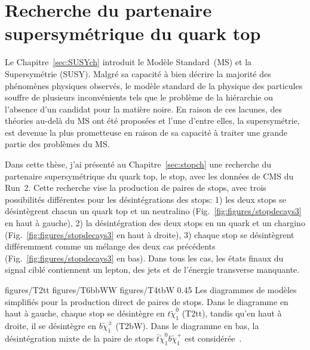 \section{Recherche du partenaire supersymétrique du quark top}

Le Chapitre~\ref{sec:SUSYch} introduit le Modèle Standard~(MS) et la Supersymétrie (SUSY). Malgré sa capacité à bien décrire la majorité des phénomènes physiques observés, le modèle standard de la physique des particules souffre de plusieurs inconvénients tels que le problème de la hiérarchie ou l’absence d’un candidat pour la matière noire. En raison de ces lacunes, des théories au-delà du MS ont été proposées et l'une d'entre elles, la supersymétrie, est devenue la plus prometteuse en raison de sa capacité à traiter une grande partie des problèmes du MS. 

Dans cette thèse, j'ai présenté au Chapitre~\ref{sec:stopch} une recherche du partenaire supersymétrique du quark top, le stop, avec les données de CMS du Run~2. Cette recherche vise la production de paires de stops, avec trois possibilités différentes pour les désintégrations des stops: 1) les deux stops se désintègrent chacun un quark top et un neutralino (Fig.~\ref{fig:figures/stopdecays3} en haut à gauche), 2) la désintégration des deux stops en un quark et un chargino (Fig.~\ref{fig:figures/stopdecays3} en haut à droite), 3) chaque stop se désintègrent différemment comme un mélange des deux cas précédents (Fig.~\ref{fig:figures/stopdecays3} en bas). Dans tous les cas, les états finaux du signal ciblé contiennent un lepton, des jets et de l'énergie transverse manquante.

                 {figures/T2tt} %
                 {figures/T6bbWW} %
                 {figures/T4tbW}
                 {0.45}       %
                 { Les diagrammes de modèles simplifiés pour la production direct de paires de stops. Dans le diagramme en haut à gauche, chaque stop se désintègre en $t  \tilde{\chi}^{0}_{1}$ (T2tt), tandis qu'en haut à droite, il se désintègre en $ b \tilde{\chi}^{\pm}_{1} $ (T2bW). Dans le diagramme en bas, la désintégration mixte de la paire de stops $\bar{t} \tilde{\chi}^{0}_{1} b \tilde{\chi}^{+}_{1}$ est considérée~\cite{website:SUSYdiagrams}. }


